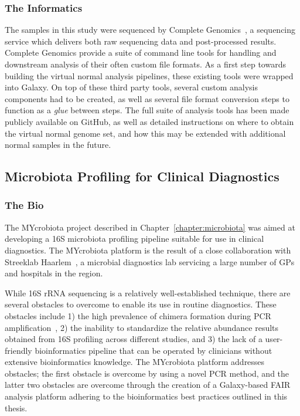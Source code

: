 \subsubsection{The Informatics}
The samples in this study were sequenced by Complete Genomics~\cite{drmanac}, a sequencing service which delivers both raw sequencing data and post-processed results. Complete Genomics provide a suite of command line tools for handling and downstream analysis of their often custom file formats. As a first step towards building the virtual normal analysis pipelines, these existing tools were wrapped into Galaxy. On top of these third party tools, several custom analysis components had to be created, as well as several file format conversion steps to function as a \emph{glue} between steps. The full suite of analysis tools has been made publicly available on GitHub, as well as detailed instructions on where to obtain the virtual normal genome set, and how this may be extended with additional normal samples in the future.


\subsection{Microbiota Profiling for Clinical Diagnostics}
\subsubsection{The Bio}
The MYcrobiota project described in Chapter~\ref{chapter:microbiota} was aimed at developing a 16S microbiota profiling pipeline suitable for use in clinical diagnostics. The MYcrobiota platform is the result of a close collaboration with Streeklab Haarlem~\cite{url-streeklab}, a microbial diagnostics lab servicing a large number of GPs and hospitals in the region.

While 16S rRNA sequencing is a relatively well-established technique, there are several obstacles to overcome to enable its use in routine diagnostics. These obstacles include 1) the high prevalence of chimera formation during PCR amplification~\cite{huttenhower2012structure}, 2) the inability to standardize the relative abundance results obtained from 16S profiling across different studies, and 3) the lack of a user-friendly bioinformatics pipeline that can be operated by clinicians without extensive bioinformatics knowledge. The MYcrobiota platform addresses obstacles; the first obstacle is overcome by using a novel PCR method, and the latter two obstacles are overcome through the creation of a Galaxy-based FAIR analysis platform adhering to the bioinformatics best practices outlined in this thesis.

